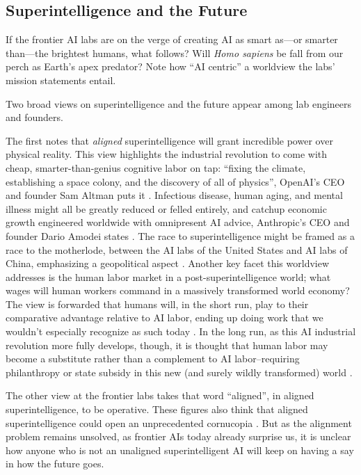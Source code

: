 \subsection{Superintelligence and the Future}
If the frontier AI labs are on the verge of creating AI as smart as---or
smarter than---the brightest humans, what follows? Will \emph{Homo sapiens} be
fall from our perch as Earth's apex predator? Note how ``AI centric'' a
worldview the labs' mission statements entail.

Two broad views on superintelligence and the future appear among lab engineers
and founders.

The first notes that \emph{aligned} superintelligence will grant incredible
power over physical reality. This view highlights the industrial revolution to
come with cheap, smarter-than-genius cognitive labor on tap: ``fixing the
climate, establishing a space colony, and the discovery of all of physics'',
OpenAI's CEO and founder Sam Altman puts it \cite{altman2024intelligence}.
Infectious disease, human aging, and mental illness might all be greatly
reduced or felled entirely, and catchup economic growth engineered worldwide
with omnipresent AI advice, Anthropic's CEO and founder Dario Amodei states
\cite{amodei2024grace}. The race to superintelligence might be framed as a race
to the motherlode, between the AI labs of the United States and AI labs of
China, emphasizing a geopolitical aspect
\cite{aschenbrenner2024situational,amodei2024grace}. Another key facet this
worldview addresses is the human labor market in a post-superintelligence
world; what wages will human workers command in a massively transformed world
economy? The view is forwarded that humans will, in the short run, play to
their comparative advantage relative to AI labor, ending up doing work that we
wouldn't especially recognize as such today
\cite{altman2024intelligence,amodei2024grace}. In the long run, as this AI
industrial revolution more fully develops, though, it is thought that human
labor may become a substitute rather than a complement to AI labor--requiring
philanthropy or state subsidy in this new (and surely wildly transformed) world
\cite{amodei2024grace}.

The other view at the frontier labs takes that word ``aligned'', in aligned
superintelligence, to be operative. These figures also think that aligned
superintelligence could open an unprecedented cornucopia
\cite{bostrom2014superintelligence,bostrom2024utopia}. But as the alignment
problem remains unsolved, as frontier AIs today already surprise us, it is
unclear how anyone who is not an unaligned superintelligent AI will keep on
having a say in how the future goes.
